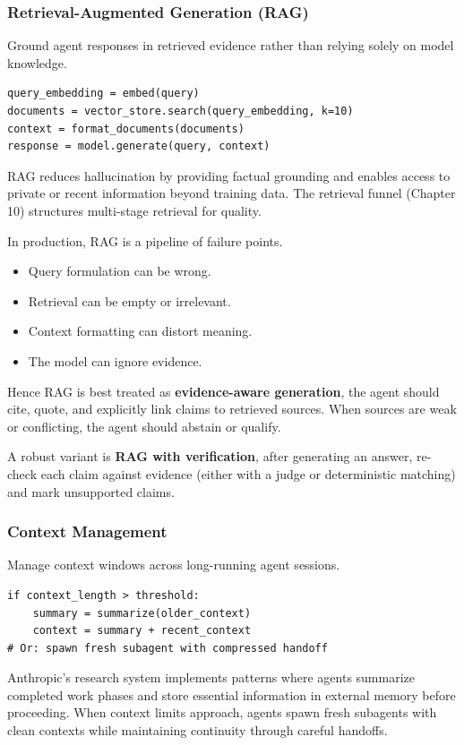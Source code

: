 \subsubsection{Retrieval-Augmented Generation (RAG)}

Ground agent responses in retrieved evidence rather than relying solely on model knowledge.

\begin{verbatim}
query_embedding = embed(query)
documents = vector_store.search(query_embedding, k=10)
context = format_documents(documents)
response = model.generate(query, context)
\end{verbatim}

RAG reduces hallucination by providing factual grounding and enables access to private or recent information beyond training data. The retrieval funnel (Chapter 10) structures multi-stage retrieval for quality.

In production, RAG is a pipeline of failure points.
\begin{itemize}
\item Query formulation can be wrong.
\item Retrieval can be empty or irrelevant.
\item Context formatting can distort meaning.
\item The model can ignore evidence.
\end{itemize}
Hence RAG is best treated as \textbf{evidence-aware generation}, the agent should cite, quote, and explicitly link claims to retrieved sources. When sources are weak or conflicting, the agent should abstain or qualify.

A robust variant is \textbf{RAG with verification}, after generating an answer, re-check each claim against evidence (either with a judge or deterministic matching) and mark unsupported claims.

\subsubsection{Context Management}

Manage context windows across long-running agent sessions.

\begin{verbatim}
if context_length > threshold:
    summary = summarize(older_context)
    context = summary + recent_context
# Or: spawn fresh subagent with compressed handoff
\end{verbatim}

Anthropic's research system \cite{anthropicresearch2025} implements patterns where agents summarize completed work phases and store essential information in external memory before proceeding. When context limits approach, agents spawn fresh subagents with clean contexts while maintaining continuity through careful handoffs.

